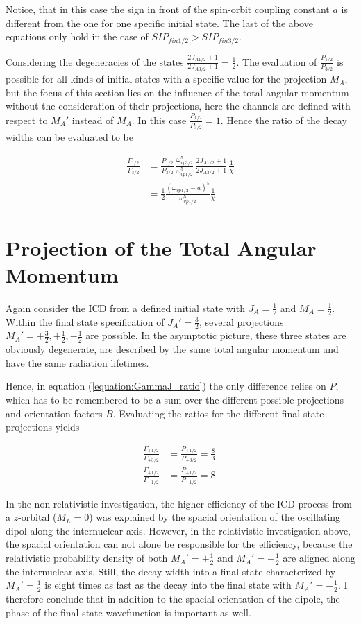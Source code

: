 Notice, that in this case the sign in front of the spin-orbit coupling
constant $a$ is different from the one for one specific initial state.
The last of the above equations only hold in the case of
$SIP_{fin1/2} > SIP_{fin3/2}$.

Considering the degeneracies of the states
$\frac{2J_{A1/2}+1}{2J_{A3/2}+1} = \frac 12$.
The evaluation of $\frac{P_{1/2}}{P_{3/2}}$ is possible for all kinds
of initial states with a specific value for the projection $M_A$, but
the focus of this section lies on the influence of the total
angular momentum without the consideration of their projections, here
the channels are defined with respect to $M_A'$ instead of
$M_A$. In this case $\frac{P_{1/2}}{P_{3/2}} = 1$.
Hence the ratio of the decay widths can be evaluated to be

\begin{align}
  \frac{\Gamma_{1/2}}{\Gamma_{3/2}}
  &= \frac{P_{1/2}}{P_{3/2}}
     \,\frac{\omega_{vp3/2}^5}{\omega_{vp1/2}^5}
     \,\frac{2J_{A1/2}+1}{2J_{A3/2}+1} \, \frac{1}{\chi}\\
  &= \frac 12 \frac{(\omega_{vp1/2} -a)^5}{\omega_{vp1/2}^5} \frac{1}{\chi}
\end{align}


\section{Projection of the Total Angular Momentum}
Again consider the ICD from a defined initial state with $J_A=\frac 12$ and
$M_A=\frac 12$. Within the final state specification of $J_A'=\frac 32$, several
projections $M_A'= +\frac 32, +\frac 12, -\frac 12$ are possible. In the asymptotic
picture, these three states are obviously degenerate, are described by the same
total angular momentum and have the same radiation lifetimes.

Hence, in equation (\ref{equation:GammaJ_ratio}) the only difference relies on $P$,
which has to be remembered to be a sum over the different possible projections
and orientation factors $B$. Evaluating the ratios for the different final state
projections yields

\begin{align}
  \frac{\Gamma_{+1/2}}{\Gamma_{+3/2}} &= \frac{P_{+1/2}}{P_{+3/2}} = \frac 83  \\
  \frac{\Gamma_{+1/2}}{\Gamma_{-1/2}} &= \frac{P_{+1/2}}{P_{-1/2}} = 8   .
\end{align}

In the non-relativistic investigation, the higher efficiency of the \ac{ICD} process
from a $z$-orbital ($M_L=0$) was explained by the spacial orientation of the
oscillating dipol along the internuclear axis.
However, in the relativistic investigation above, the spacial orientation
can not alone be responsible for the efficiency, because the relativistic
probability density of both $M_A'= +\frac 12$ and $M_A'= -\frac 12$ are aligned
along the internuclear axis. Still, the decay width into a final state characterized
by $M_A'= \frac 12$ is eight times as fast as the decay into the final state
with $M_A'= -\frac 12$. I therefore conclude that in addition to the spacial
orientation of the dipole, the phase of the final state wavefunction is
important as well.

